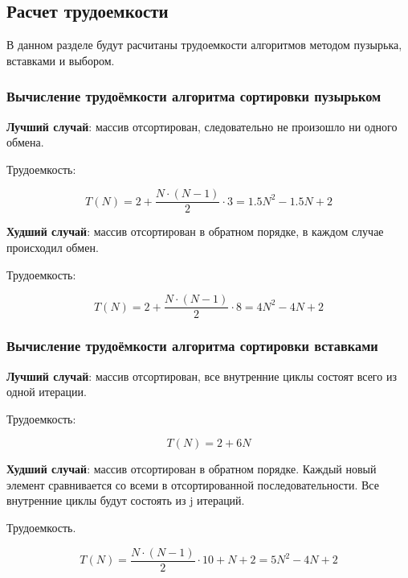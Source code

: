 \documentclass[14pt,russian]{scrartcl}
\begin{document}
\subsection{Расчет трудоемкости}

В данном разделе будут расчитаны трудоемкости алгоритмов методом пузырька, вставками и выбором.

\subsubsection{Вычисление трудоёмкости алгоритма сортировки пузырьком}

\textbf{Лучший случай}: массив отсортирован, следовательно не произошло ни одного обмена.

Трудоемкость:

\begin{equation}
    T(N) = 2 + \frac{N \cdot (N - 1)}{2}\cdot 3 = 1.5N^2 - 1.5N + 2
\end{equation}

\textbf{Худший случай}: массив отсортирован в обратном порядке, в каждом случае происходил обмен.

Трудоемкость:

\begin{equation}
    T(N) = 2 + \frac{N \cdot (N - 1)}{2}\cdot 8 = 4N^2 - 4N + 2
\end{equation}

\subsubsection{Вычисление трудоёмкости алгоритма сортировки вставками}

\textbf{Лучший случай}: массив отсортирован, все внутренние циклы состоят всего из одной итерации.

Трудоемкость:

\begin{equation}
    T(N) = 2 + 6N
\end{equation}

\textbf{Худший случай}: массив отсортирован в обратном порядке. Каждый новый элемент сравнивается со всеми в отсортированной последовательности. Все внутренние циклы будут состоять из j итераций.

Трудоемкость.

\begin{equation}
    T(N) = \frac{N \cdot (N - 1)}{2} \cdot 10 + N + 2 = 5N^2 - 4N + 2
\end{equation}
\end{document}
